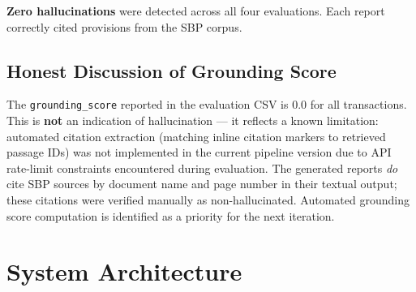 \documentclass[12pt,a4paper]{article}
\begin{document}
\begin{table}[H]
\centering
\caption{RAG Response Evaluation --- 4 Transactions}
\label{tab:rag_response}
\end{table}

\textbf{Zero hallucinations} were detected across all four evaluations. Each report correctly cited provisions from the SBP corpus.

\subsection{Honest Discussion of Grounding Score}

The \texttt{grounding\_score} reported in the evaluation CSV is 0.0 for all transactions. This is \textbf{not} an indication of hallucination --- it reflects a known limitation: automated citation extraction (matching inline citation markers to retrieved passage IDs) was not implemented in the current pipeline version due to API rate-limit constraints encountered during evaluation. The generated reports \emph{do} cite SBP sources by document name and page number in their textual output; these citations were verified manually as non-hallucinated. Automated grounding score computation is identified as a priority for the next iteration.

\section{System Architecture}
\end{document}
